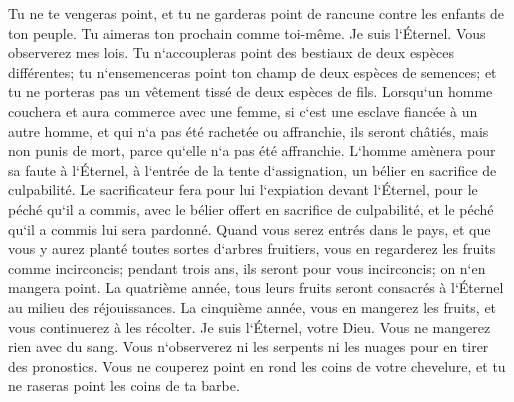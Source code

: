 \verse Tu ne te vengeras point, et tu ne garderas point de rancune contre les enfants de ton peuple. Tu aimeras ton prochain comme toi-même. Je suis l`Éternel. 
\verse Vous observerez mes lois. Tu n`accoupleras point des bestiaux de deux espèces différentes; tu n`ensemenceras point ton champ de deux espèces de semences; et tu ne porteras pas un vêtement tissé de deux espèces de fils. 
\verse Lorsqu`un homme couchera et aura commerce avec une femme, si c`est une esclave fiancée à un autre homme, et qui n`a pas été rachetée ou affranchie, ils seront châtiés, mais non punis de mort, parce qu`elle n`a pas été affranchie. 
\verse L`homme amènera pour sa faute à l`Éternel, à l`entrée de la tente d`assignation, un bélier en sacrifice de culpabilité. 
\verse Le sacrificateur fera pour lui l`expiation devant l`Éternel, pour le péché qu`il a commis, avec le bélier offert en sacrifice de culpabilité, et le péché qu`il a commis lui sera pardonné. 
\verse Quand vous serez entrés dans le pays, et que vous y aurez planté toutes sortes d`arbres fruitiers, vous en regarderez les fruits comme incirconcis; pendant trois ans, ils seront pour vous incirconcis; on n`en mangera point. 
\verse La quatrième année, tous leurs fruits seront consacrés à l`Éternel au milieu des réjouissances. 
\verse La cinquième année, vous en mangerez les fruits, et vous continuerez à les récolter. Je suis l`Éternel, votre Dieu. 
\verse Vous ne mangerez rien avec du sang. Vous n`observerez ni les serpents ni les nuages pour en tirer des pronostics. 
\verse Vous ne couperez point en rond les coins de votre chevelure, et tu ne raseras point les coins de ta barbe. 
